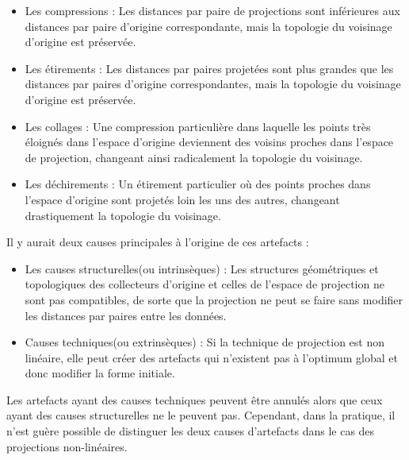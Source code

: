 \begin{itemize}
    \item Les compressions : Les distances par paire de projections sont inférieures aux distances par paire d'origine correspondante, mais la topologie du voisinage d'origine est préservée.
    \item Les étirements : Les distances par paires projetées sont plus grandes que les distances par paires d'origine correspondantes, mais la topologie du voisinage d'origine est préservée.
    \item Les collages :  Une compression particulière dans laquelle les points très éloignés dans l'espace d'origine deviennent des voisins proches dans l'espace de projection, changeant ainsi radicalement la topologie du voisinage.
    \item Les déchirements : Un étirement particulier où des points proches dans l'espace d'origine sont projetés loin les uns des autres, changeant drastiquement la topologie du voisinage.
\end{itemize}

Il y aurait deux causes principales à l'origine de ces artefacts \cite{aupetit2007visualizing} : 
\begin{itemize}
    \item Les causes structurelles(ou intrinsèques) : Les structures géométriques et topologiques des collecteurs d'origine et celles de l'espace de projection ne sont pas compatibles, de sorte que la projection ne peut se faire sans modifier les distances par paires entre les données.
    \item Causes techniques(ou extrinsèques) : Si la technique de projection est non linéaire, elle peut créer des artefacts qui n'existent pas à l'optimum global et donc modifier la forme initiale.
\end{itemize}

Les artefacts ayant des causes techniques peuvent être annulés alors que ceux ayant des causes structurelles ne le peuvent pas. Cependant, dans la pratique, il n'est guère possible de distinguer les deux causes d'artefacts dans le cas des projections non-linéaires.



